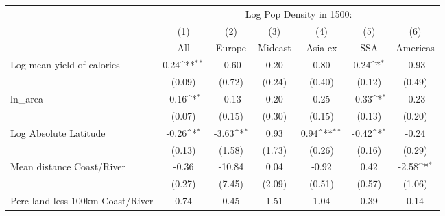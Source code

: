 {
\def\sym#1{\ifmmode^{#1}\else\(^{#1}\)\fi}
\begin{tabular}{l*{6}{c}}
\toprule
                    &\multicolumn{6}{c}{Log Pop Density in 1500:}                                                                                       \\
                    &\multicolumn{1}{c}{(1)}         &\multicolumn{1}{c}{(2)}         &\multicolumn{1}{c}{(3)}         &\multicolumn{1}{c}{(4)}         &\multicolumn{1}{c}{(5)}         &\multicolumn{1}{c}{(6)}         \\
                    &         All         &      Europe         &     Mideast         &     Asia ex         &         SSA         &    Americas         \\
\midrule
Log mean yield of calories&        0.24\sym{**} &       -0.60         &        0.20         &        0.80         &        0.24\sym{*}  &       -0.93         \\
                    &      (0.09)         &      (0.72)         &      (0.24)         &      (0.40)         &      (0.12)         &      (0.49)         \\
\addlinespace
ln\_area             &       -0.16\sym{*}  &       -0.13         &        0.20         &        0.25         &       -0.33\sym{*}  &       -0.23         \\
                    &      (0.07)         &      (0.15)         &      (0.30)         &      (0.15)         &      (0.13)         &      (0.20)         \\
\addlinespace
Log Absolute Latitude&       -0.26\sym{*}  &       -3.63\sym{*}  &        0.93         &        0.94\sym{**} &       -0.42\sym{*}  &       -0.24         \\
                    &      (0.13)         &      (1.58)         &      (1.73)         &      (0.26)         &      (0.16)         &      (0.29)         \\
\addlinespace
Mean distance Coast/River&       -0.36         &      -10.84         &        0.04         &       -0.92         &        0.42         &       -2.58\sym{*}  \\
                    &      (0.27)         &      (7.45)         &      (2.09)         &      (0.51)         &      (0.57)         &      (1.06)         \\
\addlinespace
Perc land less 100km Coast/River&        0.74         &        0.45         &        1.51         &        1.04         &        0.39         &        0.14         \\

\end{tabular}}
